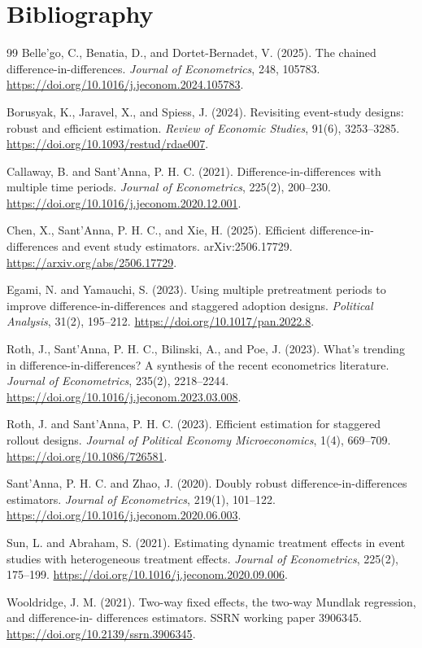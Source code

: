 \documentclass[11pt]{article}
\theoremstyle{definition}
\theoremstyle{plain}
\theoremstyle{remark}
\begin{document}
\section*{Bibliography}
\begin{thebibliography}{99}
Belle'go, C., Benatia, D., and Dortet-Bernadet, V. (2025).
The chained difference-in-differences.
\emph{Journal of Econometrics}, 248, 105783.
\url{https://doi.org/10.1016/j.jeconom.2024.105783}.

Borusyak, K., Jaravel, X., and Spiess, J. (2024).
Revisiting event-study designs: robust and efficient estimation.
\emph{Review of Economic Studies}, 91(6), 3253--3285.
\url{https://doi.org/10.1093/restud/rdae007}.

Callaway, B. and Sant'Anna, P. H. C. (2021).
Difference-in-differences with multiple time periods.
\emph{Journal of Econometrics}, 225(2), 200--230.
\url{https://doi.org/10.1016/j.jeconom.2020.12.001}.

Chen, X., Sant'Anna, P. H. C., and Xie, H. (2025).
Efficient difference-in-differences and event study estimators.
arXiv:2506.17729.
\url{https://arxiv.org/abs/2506.17729}.

Egami, N. and Yamauchi, S. (2023).
Using multiple pretreatment periods to improve difference-in-differences and
staggered adoption designs.
\emph{Political Analysis}, 31(2), 195--212.
\url{https://doi.org/10.1017/pan.2022.8}.

Roth, J., Sant'Anna, P. H. C., Bilinski, A., and Poe, J. (2023).
What's trending in difference-in-differences? A synthesis of the recent
econometrics literature.
\emph{Journal of Econometrics}, 235(2), 2218--2244.
\url{https://doi.org/10.1016/j.jeconom.2023.03.008}.

Roth, J. and Sant'Anna, P. H. C. (2023).
Efficient estimation for staggered rollout designs.
\emph{Journal of Political Economy Microeconomics}, 1(4), 669--709.
\url{https://doi.org/10.1086/726581}.

Sant'Anna, P. H. C. and Zhao, J. (2020).
Doubly robust difference-in-differences estimators.
\emph{Journal of Econometrics}, 219(1), 101--122.
\url{https://doi.org/10.1016/j.jeconom.2020.06.003}.

Sun, L. and Abraham, S. (2021).
Estimating dynamic treatment effects in event studies with heterogeneous
treatment effects.
\emph{Journal of Econometrics}, 225(2), 175--199.
\url{https://doi.org/10.1016/j.jeconom.2020.09.006}.

Wooldridge, J. M. (2021).
Two-way fixed effects, the two-way Mundlak regression, and difference-in-
differences estimators.
SSRN working paper 3906345.
\url{https://doi.org/10.2139/ssrn.3906345}.
\end{thebibliography}
\end{document}
